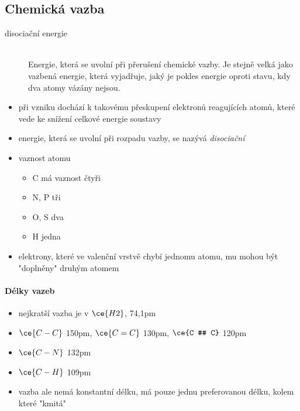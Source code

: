 \documentclass[DIV=8]{scrreprt}
\begin{document}
\subsection{Chemická vazba} \label{Chemická vazba}


\begin{description}
\item[disociační energie]\hfill \\
Energie, která se uvolní při přerušení chemické vazby. Je stejně velká jako vazbená energie, která vyjadřuje, jaký je pokles energie oproti stavu, kdy dva atomy vázány nejsou.

\end{description}


\begin{itemize}[nosep]
    \item při vzniku dochází k takovému přeskupení elektronů reagujících atomů, které vede ke snížení celkové energie soustavy
    \item  energie, která se uvolní při rozpadu vazby, se nazývá \emph{disociační}
    \item vaznost atomu
\begin{itemize}[nosep]
    \item C má vaznost čtyři
    \item N, P tři
    \item O, S dva
    \item H jedna
\end{itemize}

    \item elektrony, které ve valenční vrstvě chybí jednomu atomu, mu mohou být "doplněny" druhým atomem
\end{itemize}



\paragraph{Délky vazeb}
\begin{itemize}[nosep]
    \item nejkratší vazba je v \(\ce{H2}\), 74,1pm
    \item \(\ce{C-C}\) 150pm, \(\ce{C = C}\) 130pm, \(\ce{C # C}\) 120pm
    \item \(\ce{C-N}\) 132pm
    \item \(\ce{C - H}\) 109pm
    \item vazba ale nemá konstantní délku, má pouze jednu preferovanou délku, kolem které "kmitá"
\end{itemize}
\end{document}
